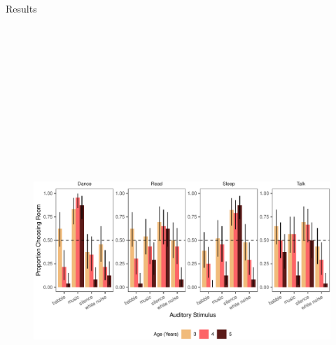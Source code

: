 \documentclass[final]{beamer}
\newlength{\colwidth}
\begin{document}
\begin{frame}[t]
\begin{columns}[t]
\begin{column}{\colwidth}
\begin{block}{Results}
    \begin{figure}
      \includegraphics[width = 14in, height = 7in]{../writeup/figs/e3b-bar-1.pdf}
    \end{figure}


\end{block}
\end{column}
\end{columns}
\end{frame}
\end{document}

